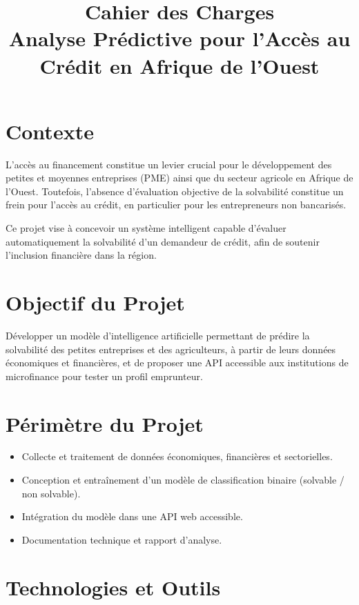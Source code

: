 \documentclass[12pt]{article}
\title{Cahier des Charges \\ \large Analyse Prédictive pour l’Accès au Crédit en Afrique de l’Ouest}
\author{}
\date{}
\begin{document}
	
	\maketitle
	
	\section{Contexte}
	
	L’accès au financement constitue un levier crucial pour le développement des petites et moyennes entreprises (PME) ainsi que du secteur agricole en Afrique de l’Ouest. Toutefois, l'absence d’évaluation objective de la solvabilité constitue un frein pour l’accès au crédit, en particulier pour les entrepreneurs non bancarisés.
	
	Ce projet vise à concevoir un système intelligent capable d’évaluer automatiquement la solvabilité d’un demandeur de crédit, afin de soutenir l’inclusion financière dans la région.
	
	\section{Objectif du Projet}
	
	Développer un modèle d’intelligence artificielle permettant de prédire la solvabilité des petites entreprises et des agriculteurs, à partir de leurs données économiques et financières, et de proposer une API accessible aux institutions de microfinance pour tester un profil emprunteur.
	
	\section{Périmètre du Projet}
	
	\begin{itemize}[label=--]
		\item Collecte et traitement de données économiques, financières et sectorielles.
		\item Conception et entraînement d’un modèle de classification binaire (solvable / non solvable).
		\item Intégration du modèle dans une API web accessible.
		\item Documentation technique et rapport d’analyse.
	\end{itemize}
	
	\section{Technologies et Outils}
	
\end{document}
